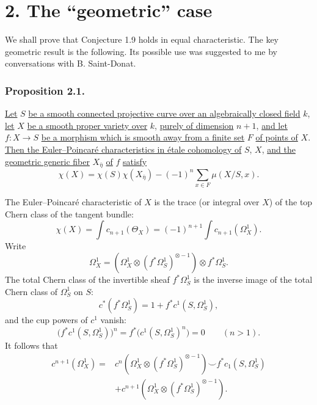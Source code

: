 \section*{2. The ``geometric'' case}

We shall prove that Conjecture 1.9 holds in equal characteristic.
The key geometric result is the following.  Its possible use was
suggested to me by conversations with B. Saint-Donat.

\subsubsection*{Proposition 2.1.}
\underline{Let} $S$ \underline{be a smooth connected projective curve over an
algebraically closed field} $k$, \underline{let} $X$ \underline{be a smooth proper variety
over} $k$, \underline{purely of dimension} $n+1$, \underline{and let} $f:X\to S$ \underline{be a
morphism which is smooth away from a finite set} $F$ \underline{of points of}
$X$.  \underline{Then the Euler--Poincar\'e characteristics in \'etale
cohomology of} $S$, $X$, \underline{and the geometric generic fiber}
$X_{\bar\eta}$ \underline{of} $f$ \underline{satisfy}
\begin{equation}\tag{2.1.1}
\chi(X)=\chi(S)\chi(X_{\bar\eta})
-(-1)^n\sum_{x\in F}\mu(X/S,x).
\end{equation}

The Euler--Poincar\'e characteristic of $X$ is the trace (or integral
over $X$) of the top Chern class of the tangent bundle:
\[
\chi(X)=\int c_{n+1}(\Theta_X)
=(-1)^{n+1}\int c_{n+1}(\Omega_X^1).
\]
Write
\[
\Omega_X^1=\left(\Omega_X^1\otimes
(f^*\Omega_S^1)^{\otimes-1}\right)\otimes f^*\Omega_S^1.
\]
The total Chern class of the invertible sheaf $f^*\Omega_S^1$ is
the inverse image of the total Chern class of $\Omega_S^1$ on $S$:
\[
c^*(f^*\Omega_S^1)=1+f^*c^1(S,\Omega_S^1),
\]
and the cup powers of $c^1$ vanish:
\[
\bigl(f^*c^1(S,\Omega_S^1)\bigr)^n
=f^*\bigl(c^1(S,\Omega_S^1)^n\bigr)=0
\qquad(n>1).
\]
It follows that
\begin{align*}
c^{n+1}(\Omega_X^1)
={}&c^n\!\left(\Omega_X^1\otimes
(f^*\Omega_S^1)^{\otimes-1}\right)
\smile f^*c_1(S,\Omega_S^1)\\
&+c^{n+1}\!\left(\Omega_X^1\otimes
(f^*\Omega_S^1)^{\otimes-1}\right).
\end{align*}

